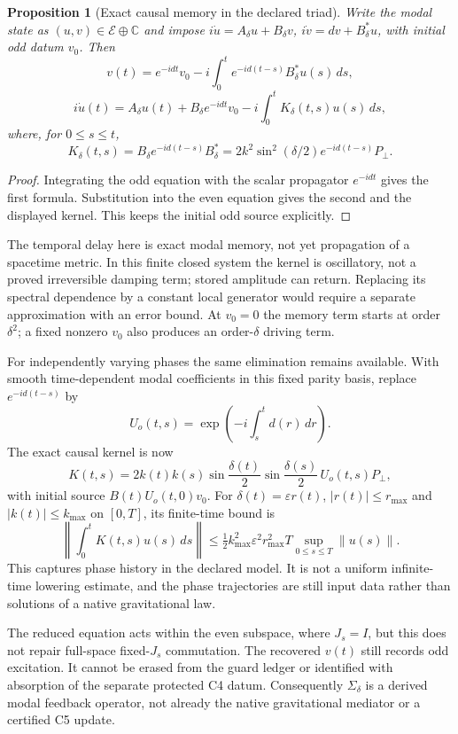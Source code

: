 \documentclass[11pt,a4paper]{article}
\newtheorem{proposition}{Proposition}
\begin{document}
\begin{proposition}[Exact causal memory in the declared triad]
Write the modal state as $(u,v)\in\mathcal E\oplus\mathbb C$ and impose
$i\dot u=A_\delta u+B_\delta v$,
$i\dot v=dv+B_\delta^*u$, with initial odd datum $v_0$. Then
\[
 v(t)=e^{-idt}v_0-i\int_0^t e^{-id(t-s)}B_\delta^*u(s)\,ds,
\]
\[
 i\dot u(t)=A_\delta u(t)+B_\delta e^{-idt}v_0
 -i\int_0^t K_\delta(t,s)u(s)\,ds,
\]
where, for $0\le s\le t$,
\[
 K_\delta(t,s)=B_\delta e^{-id(t-s)}B_\delta^*
 =2k^2\sin^2(\delta/2)e^{-id(t-s)}P_\perp.
\]
\end{proposition}
\begin{proof}
Integrating the odd equation with the scalar propagator $e^{-idt}$ gives
the first formula. Substitution into the even equation gives the second
and the displayed kernel. This keeps the initial odd source explicitly.
\end{proof}

The temporal delay here is exact modal memory, not yet propagation of a
spacetime metric. In this finite closed system the kernel is oscillatory,
not a proved irreversible damping term; stored amplitude can return.
Replacing its spectral dependence by a constant local generator would
require a separate approximation with an error bound. At $v_0=0$ the
memory term starts at order $\delta^2$; a fixed nonzero $v_0$ also produces
an order-$\delta$ driving term.

For independently varying phases the same elimination remains available.
With smooth time-dependent modal coefficients in this fixed parity basis,
replace $e^{-id(t-s)}$ by
\[
 U_o(t,s)=\exp\left(-i\int_s^t d(r)\,dr\right).
\]
The exact causal kernel is now
\[
 K(t,s)=2k(t)k(s)\sin\!\frac{\delta(t)}2
 \sin\!\frac{\delta(s)}2\,U_o(t,s)P_\perp,
\]
with initial source $B(t)U_o(t,0)v_0$. For
$\delta(t)=\varepsilon r(t)$, $|r(t)|\le r_{\max}$ and
$|k(t)|\le k_{\max}$ on $[0,T]$, its finite-time bound is
\[
 \left\|\int_0^t K(t,s)u(s)\,ds\right\|
 \le\tfrac12 k_{\max}^2\varepsilon^2r_{\max}^2 T
 \sup_{0\le s\le T}\|u(s)\|.
\]
This captures phase history in the declared model. It is not a
uniform infinite-time lowering estimate, and the phase trajectories
are still input data rather than solutions of a native gravitational law.

The reduced equation acts within the even subspace, where $J_s=I$, but
this does not repair full-space fixed-$J_s$ commutation. The recovered
$v(t)$ still records odd excitation. It cannot be erased from the guard
ledger or identified with absorption of the separate protected C4 datum.
Consequently $\Sigma_\delta$ is a derived modal feedback operator, not
already the native gravitational mediator or a certified C5 update.
\end{document}

